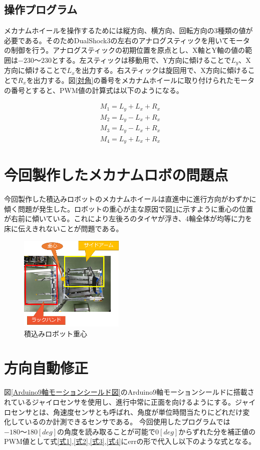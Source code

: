 \documentclass[twocolumn,11pt]{sotsuken_abst}
\begin{document}
	\subsection{操作プログラム}
	メカナムホイールを操作するためには縦方向、横方向、回転方向の3種類の値が必要である。そのためDualShock3の左右のアナログスティックを用いてモータの制御を行う。アナログスティックの初期位置を原点とし、X軸とY軸の値の範囲は$-230～230$とする。左スティックは移動用で、Y方向に傾けることで$L_y$、X方向に傾けることで$L_x$を出力する。右スティックは旋回用で、X方向に傾けることで$R_x$を出力する。図\ref{対角}の番号をメカナムホイールに取り付けられたモータの番号とすると、PWM値の計算式は以下のようになる。

	\begin{eqnarray}
	M_1 = L_y + L_x + R_x
	\label{式1}
	\\
	M_2 = L_y - L_x + R_x
	\label{式2}
	\\
	M_3 = L_y - L_x + R_x
	\label{式3}
	\\
	M_4 = L_y + L_x + R_x
	\label{式4}
	\end{eqnarray}

\section{今回製作したメカナムロボの問題点}
今回製作した積込みロボットのメカナムホイールは直進中に進行方向がわずかに傾く問題が発生した。ロボットの重心が主な原因で図\ref{積込みロボット重心}に示すように重心の位置が右前に傾いている。これにより左後ろのタイヤが浮き、4輪全体が均等に力を床に伝えきれないことが問題である。

\begin{figure}[htp]
	\begin{center}
		\includegraphics[width=50mm]{Image/積込みロボット重心.png}
		\caption{積込みロボット重心}
		\label{積込みロボット重心}
	\end{center}
\end{figure}

\section{方向自動修正}
図\ref{Arduino9軸モーションシールド図}のArduino9軸モーションシールドに搭載されているジャイロセンサを使用し、進行中常に正面を向けるようにする。ジャイロセンサとは、角速度センサとも呼ばれ、角度が単位時間当たりにどれだけ変化しているのか計測できるセンサである。
今回使用したプログラムでは$-180～180[deg]$の角度を読み取ることが可能で$0[deg]$からずれた分を補正値のPWM値として式\ref{式1},\ref{式2},\ref{式3},\ref{式4}にerrの形で代入し以下のような式となる。
\end{document}
